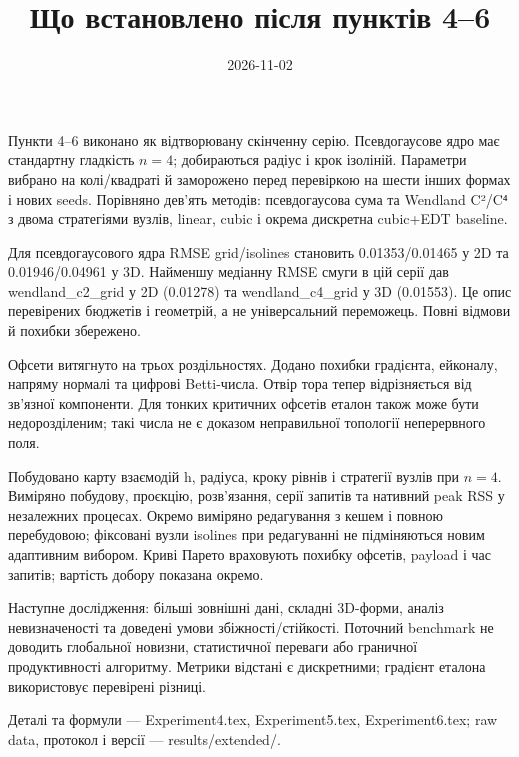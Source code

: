 \documentclass[11pt,a4paper]{article}
\begin{document}
\title{Що встановлено після пунктів 4–6}\author{}\date{2026-11-02}\maketitle
Пункти 4--6 виконано як відтворювану скінченну серію.
Псевдогаусове ядро має стандартну гладкість $n=4$;
добираються радіус і крок ізоліній.
Параметри вибрано на колі/квадраті й заморожено перед перевіркою
на шести інших формах і нових seeds. Порівняно дев'ять методів:
псевдогаусова сума та Wendland C²/C⁴ з двома стратегіями вузлів,
linear, cubic і окрема дискретна cubic+EDT baseline.

Для псевдогаусового ядра RMSE grid/isolines становить 0.01353/0.01465 у 2D та 0.01946/0.04961 у 3D.
Найменшу медіанну RMSE смуги в цій серії дав wendland\_c2\_grid у 2D (0.01278) та wendland\_c4\_grid у 3D (0.01553).
Це опис перевірених бюджетів і геометрій, а не універсальний переможець.
Повні відмови й похибки збережено.

Офсети витягнуто на трьох роздільностях. Додано похибки градієнта,
ейконалу, напряму нормалі та цифрові Betti-числа. Отвір тора тепер
відрізняється від зв'язної компоненти. Для тонких критичних офсетів
еталон також може бути недорозділеним; такі числа не є доказом
неправильної топології неперервного поля.

Побудовано карту взаємодій h, радіуса, кроку рівнів і стратегії
вузлів при $n=4$. Виміряно побудову, проєкцію, розв'язання, серії запитів
та нативний peak RSS у незалежних процесах. Окремо виміряно
редагування з кешем і повною перебудовою; фіксовані вузли isolines
при редагуванні не підміняються новим адаптивним вибором. Криві Парето враховують
похибку офсетів, payload і час запитів; вартість добору показана окремо.

Наступне дослідження: більші зовнішні дані, складні 3D-форми,
аналіз невизначеності та доведені умови збіжності/стійкості.
Поточний benchmark не доводить глобальної новизни, статистичної
переваги або граничної продуктивності алгоритму. Метрики відстані
є дискретними; градієнт еталона використовує перевірені різниці.

Деталі та формули --- Experiment4.tex, Experiment5.tex,
Experiment6.tex; raw data, протокол і версії --- results/extended/.
\end{document}
